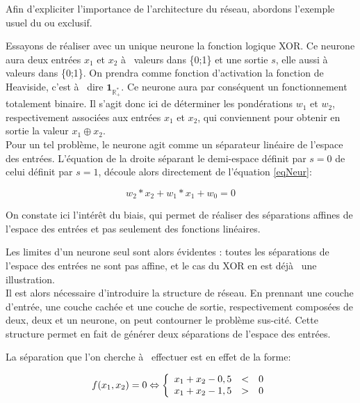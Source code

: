 \documentclass[a4paper,twoside]{report}
\begin{document}
                Afin d'expliciter l'importance de l'architecture du réseau, abordons l'exemple usuel du ou exclusif.

                Essayons de réaliser avec un unique neurone la fonction logique XOR. Ce neurone aura deux entrées $x_{1}$ et $x_{2}$ à  valeurs dans \{0;1\} et une sortie $s$, elle aussi à  valeurs dans \{0;1\}. On prendra comme fonction d'activation la fonction de Heaviside, c'est à  dire $\mathbf{1}_{\mathbb{R}^{*}_{+}}$. Ce neurone aura par conséquent un fonctionnement totalement binaire. Il s'agit donc ici de déterminer les pondérations $w_{1}$ et $w_{2}$, respectivement associées aux entrées $x_{1}$ et $x_{2}$, qui conviennent pour obtenir en sortie la valeur $x_{1}\oplus x_{2}$.\\

                Pour un tel problème, le neurone agit comme un séparateur linéaire de l'espace des entrées. L'équation de la droite séparant le demi-espace définit par $s=0$ de celui définit par $s=1$, découle alors directement de l'équation \ref{eqNeur}:

                \begin{equation}w_{2}*x_{2}+w_{1}*x_{1}+w_{0}=0\end{equation}

                On constate ici l'intérêt du biais, qui permet de réaliser des séparations affines de l'espace des entrées et pas seulement des fonctions linéaires.

                Les limites d'un neurone seul sont alors évidentes : toutes les séparations de l'espace des entrées ne sont pas affine, et le cas du XOR en est déjà  une illustration.\\

                Il est alors nécessaire d'introduire la structure de réseau. En prennant une couche d'entrée, une couche cachée et une couche de sortie, respectivement composées de deux, deux et un neurone, on peut contourner le problème sus-cité. Cette structure permet en fait de générer deux séparations de l'espace des entrées.

                La séparation que l'on cherche à  effectuer est en effet de la forme:

                \begin{equation}
                    f(x_{1},x_{2})=0 \Leftrightarrow
                    \left\{
                        \begin{array}{r c l}
                        x_{1}+x_{2}-0,5 &<& 0\\
                        x_{1}+x_{2}-1,5 &>& 0
                        \end{array}
                    \right.
                \end{equation}\\
\end{document}

